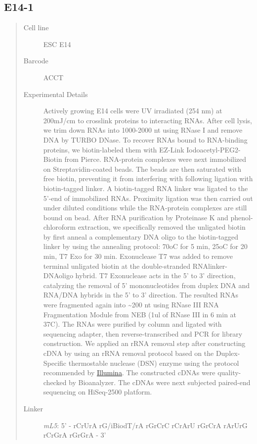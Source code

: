 \documentclass[letterpaper,10pt,english]{sphinxmanual}
\begin{document}
\subsection{E14-1}
\label{Data_Resources:e14-1}\begin{quote}\begin{description}
\item[{Cell line}] \leavevmode
ESC E14

\item[{Barcode}] \leavevmode
ACCT

\item[{Experimental Details}] \leavevmode
Actively growing E14 cells were UV irradiated (254 nm) at 200mJ/cm
to crosslink proteins to interacting RNAs. After cell lysis, we trim down RNAs into
1000-2000 nt using RNase I and remove DNA by TURBO DNase. To recover RNAs bound to
RNA-binding proteins, we biotin-labeled them with EZ-Link Iodoacetyl-PEG2-Biotin from
Pierce. RNA-protein complexes were next immobilized on Streptavidin-coated beads. The
beads are then saturated with free biotin, preventing it from interfering with following
ligation with biotin-tagged linker. A biotin-tagged RNA linker was ligated to the 5’-end
of immobilized RNAs. Proximity ligation was then carried out under diluted conditions
while the RNA-protein complexes are still bound on bead. After RNA purification by
Proteinase K and phenol-chloroform extraction, we specifically removed the unligated
biotin by first anneal a complementary DNA oligo to the biotin-tagged linker by using
the annealing protocol: 70oC for 5 min, 25oC for 20 min, T7 Exo for 30 min. Exonuclease
T7 was added to remove terminal unligated biotin at the double-stranded RNAlinker-DNAoligo
hybrid. T7 Exonuclease acts in the 5' to 3' direction, catalyzing the removal of 5'
mononucleotides from duplex DNA and RNA/DNA hybrids in the 5’ to 3’ direction. The resulted
RNAs were fragmented again into \textasciitilde{}200 nt using RNase III RNA Fragmentation Module from NEB
(1ul of RNase III in 6 min at 37C). The RNAs were purified by column and ligated with
sequencing adapter, then reverse-transcribed and PCR for library construction. We applied
an rRNA removal step after constructing cDNA by using an rRNA removal protocol based on
the Duplex-Specific thermostable nuclease (DSN) enzyme using the protocol recommended by
\href{http://supportres.illumina.com/documents/myillumina/7836bd3e-3358-4834-b2f7-80f80acb4e3f/dsn\_normalization\_sampleprep\_application\_note\_15014673\_c.pdf}{Illumina}.
The constructed cDNAs were quality-checked by Bioanalyzer. The cDNAs were next
subjected paired-end sequencing on HiSeq-2500 platform.

\item[{Linker}] \leavevmode
\emph{mL5}: 5' - rCrUrA rG/iBiodT/rA rGrCrC rCrArU rGrCrA rArUrG rCrGrA rGrGrA - 3'

\end{description}\end{quote}
\end{document}

